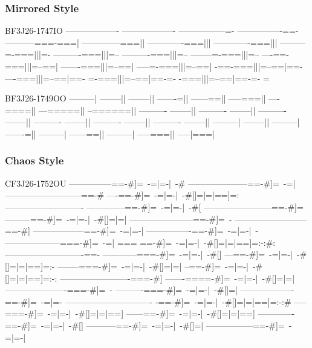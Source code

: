 \documentclass[a4paper, 18pt]{book} %
\begin{document}
{{{\newpage


\subsubsection{Mirrored Style}


   \begin{tcbverbatim}[title=Sample OUTPUT 3 from ATAG v2]
BF3J26-1747IO
-------------------
-------------------
-----------------=-
----------------==-
-----------===-===|
--------------===||
-------------===|||
-------------===|||
---------=-===|||=-
----------===|||=--
----------===|||=--
--------=-===|||=--
----==-===|||=--==|
-------===|||=--==|
-----=-===|||=--==|
-==-===|||=--==|==-
----===|||=--==|==-
=-===|||=--==|==-=-
-===|||=--==|==-=-
=
  \end{tcbverbatim}
  

\newpage


 \begin{tcbverbatim}[title=Sample OUTPUT 4 from ATAG v2]
BF3J26-1749OO
---------|
--------||
--------||
-------=||
------==||
-----===||
----====||
---=====||
--======||
----------
--------||
----------
--------||
----------
--------||
----------
--------||
----------
--------||
----------
--------||
---------|
--------||
---------|
-------=||
---------|
------==||
---------|
-----===||
-----|===|
  \end{tcbverbatim}
  

\newpage


\subsubsection{Chaos Style}



 \begin{tcbverbatim}[title=Sample OUTPUT 5 from ATAG v2]
CF3J26-1752OU
---------------==-#]=~-=|=-|~-#
---------------------==-#]=~-=|
---------------------------==-#
----==-#]=~-=|=-|~-#[]=|=|==]=:
----------------------------
--------------==-#]=~-=|=-|~-#[
------------------------==-#]=~
---------==-#]=~-=|=-|~-#[]=|=|
-----------------------==-#]=~-
--------------------------==-#]
------------------==-#]=~-=|=-|
----------------==-#]=~-=|=-|~-
--------------------===-#]=~-=|
===
==-#]=~-=|=-|~-#[]=|=|==]=:-:#:
----------------------------==-
------------===-#]=~-=|=-|~-#[]
---==-#]=~-=|=-|~-#[]=|=|==]=:-
--------===-#]=~-=|=-|~-#[]=|=|
--==-#]=~-=|=-|~-#[]=|=|==]=:-:
-------------------------===-#]
-------====-#]=~-=|=-|~-#[]=|=|
----------------------===-#]=~-
----------===-#]=~-=|=-|~-#[]=|
-------------------==-#]=~-=|=-
-------------------------------
-==-#]=~-=|=-|~-#[]=|=|==]=:-:#
-----===-#]=~-=|=-|~-#[]=|=|==]
------==-#]=~-=|=-|~-#[]=|=|==]
-------------==-#]=~-=|=-|~-#[]
-----------==-#]=~-=|=-|~-#[]=|
-----------------==-#]=~-=|=-|~
  \end{tcbverbatim}
  

}}}
\end{document}
